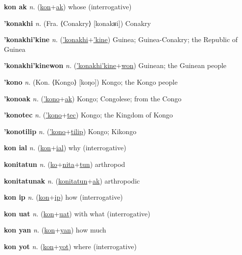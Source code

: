 \textbf{\hypertarget{kon ak}{kon ak}} \textit{n.} (\hyperlink{kon}{kon}+\allowbreak \hyperlink{ak}{ak})
whose (interrogative)

\textbf{\hypertarget{'konakhi}{'konakhi}} \textit{n.} (Fra. ⟨Conakry⟩ [konakʁi])
Conakry

\textbf{\hypertarget{'konakhi'kine}{'konakhi'kine}} \textit{n.} (\hyperlink{'konakhi}{'konakhi}+\allowbreak \hyperlink{'kine}{'kine})
Guinea; Guinea-Conakry; the Republic of Guinea

\textbf{\hypertarget{'konakhi'kinewon}{'konakhi'kinewon}} \textit{n.} (\hyperlink{'konakhi'kine}{'konakhi'kine}+\allowbreak \hyperlink{won}{won})
Guinean; the Guinean people

\textbf{\hypertarget{'kono}{'kono}} \textit{n.} (Kon. ⟨Kongo⟩ [koŋo])
Kongo; the Kongo people

\textbf{\hypertarget{'konoak}{'konoak}} \textit{n.} (\hyperlink{'kono}{'kono}+\allowbreak \hyperlink{ak}{ak})
Kongo; Congolese; from the Congo

\textbf{\hypertarget{'konotec}{'konotec}} \textit{n.} (\hyperlink{'kono}{'kono}+\allowbreak \hyperlink{tec}{tec})
Kongo; the Kingdom of Kongo

\textbf{\hypertarget{'konotilip}{'konotilip}} \textit{n.} (\hyperlink{'kono}{'kono}+\allowbreak \hyperlink{tilip}{tilip})
Kongo; Kikongo

\textbf{\hypertarget{kon ial}{kon ial}} \textit{n.} (\hyperlink{kon}{kon}+\allowbreak \hyperlink{ial}{ial})
why (interrogative)

\textbf{\hypertarget{konitatun}{konitatun}} \textit{n.} (\hyperlink{ko}{ko}+\allowbreak \hyperlink{nita}{nita}+\allowbreak \hyperlink{tun}{tun})
arthropod

\textbf{\hypertarget{konitatunak}{konitatunak}} \textit{n.} (\hyperlink{konitatun}{konitatun}+\allowbreak \hyperlink{ak}{ak})
arthropodic

\textbf{\hypertarget{kon ip}{kon ip}} \textit{n.} (\hyperlink{kon}{kon}+\allowbreak \hyperlink{ip}{ip})
how (interrogative)

\textbf{\hypertarget{kon uat}{kon uat}} \textit{n.} (\hyperlink{kon}{kon}+\allowbreak \hyperlink{uat}{uat})
with what (interrogative)

\textbf{\hypertarget{kon yan}{kon yan}} \textit{n.} (\hyperlink{kon}{kon}+\allowbreak \hyperlink{yan}{yan})
how much

\textbf{\hypertarget{kon yot}{kon yot}} \textit{n.} (\hyperlink{kon}{kon}+\allowbreak \hyperlink{yot}{yot})
where (interrogative)

